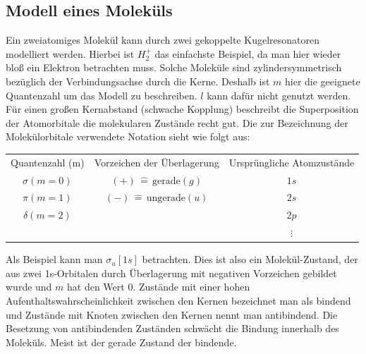 \documentclass[german,  %
parskip=full,  %
]{scrartcl}
\begin{document}
\subsection{Modell eines Moleküls}
Ein zweiatomiges Molekül kann durch zwei gekoppelte Kugelresonatoren modelliert werden. Hierbei ist $H^{+}_{2}$ das einfachste Beispiel, da man hier wieder bloß ein Elektron betrachten muss. Solche Moleküle sind zylindersymmetrisch bezüglich der Verbindungsachse durch die Kerne. Deshalb ist $m$ hier die geeignete Quantenzahl um das Modell zu beschreiben.  $l$ kann dafür nicht genutzt werden. Für einen großen Kernabstand (schwache Kopplung) beschreibt die Superposition der Atomorbitale die molekularen Zustände recht gut. Die zur Bezeichnung der Molekülorbitale verwendete Notation sieht wie folgt aus:
\newline
\newline
\begin{tabular}{ccc}
Quantenzahl (m) & Vorzeichen der Überlagerung & Ursprüngliche Atomzustände \\
$\sigma (m=0)$ & $(+) \, \hat{=} \, \text{gerade} (g)$ & $1s$ \\
$\pi (m=1) $ & $(-) \, \hat{=} \, \text{ungerade}(u)$ & $2s$\\
$\delta (m=2)$ &  & $2p$ \\
 &  &  $\vdots$ \\
\end{tabular}
\newline
Als Beispiel kann man $\sigma_{u}[1s]$ betrachten. Dies ist also ein Molekül-Zustand, der aus zwei 1s-Orbitalen durch Überlagerung mit negativen Vorzeichen gebildet wurde und $m$ hat den Wert 0. Zustände mit einer hohen Aufenthaltswahrscheinlichkeit zwischen den Kernen bezeichnet man als bindend und Zustände mit Knoten zwischen den Kernen nennt man antibindend. Die Besetzung von antibindenden Zuständen schwächt die Bindung innerhalb des Moleküls. Meist ist der gerade Zustand der bindende.
\end{document}

